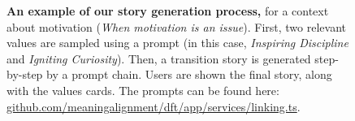 \documentclass{article}
\theoremstyle{definition}
\begin{document}
\begin{figure}[htbp]
    \caption{\textbf{An example of our story generation process,} for a context about motivation (\textit{When motivation is an issue}). First, two relevant values are sampled using a prompt (in this case, \textit{Inspiring Discipline} and \textit{Igniting Curiosity}). Then,  a transition story is generated step-by-step by a prompt chain. Users are shown the final story, along with the values cards. 
    \newline
    \newline
    The prompts can be found here: \href{https://github.com/meaningalignment/dft/blob/aa42d676e5ad6ff15e220573967d799c09538efd/app/services/linking.ts}{github.com/meaningalignment/dft/app/services/linking.ts}.
    } %
    \label{fig:generation} %
\end{figure}
\end{document}
